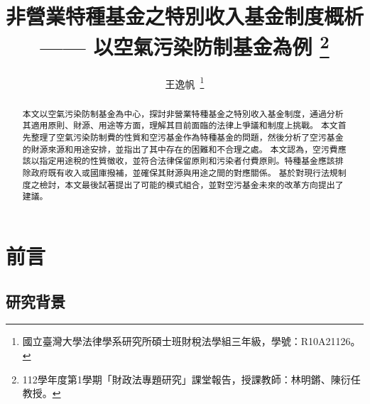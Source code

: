 \documentclass[12pt,a4paper]{article}
\author{王逸帆\,
\thanks{國立臺灣大學法律學系研究所碩士班財稅法學組三年級，學號：R10A21126。}
\vspace{-60em}
}
\date{}
\title{非營業特種基金之特別收入基金制度概析
\\  \large —— 以空氣污染防制基金為例
\thanks{
  112學年度第1學期「財政法專題研究」課堂報告，授課教師：林明鏘、陳衍任教授。}}
\begin{document}
\maketitle
\makeatother

\vspace{1pt}

\begin{abstract}
\setlength{\parindent}{2em}
\noindent
\hspace*{0.9\parindent}


本文以空氣污染防制基金為中心，探討非營業特種基金之特別收入基金制度，通過分析其適用原則、財源、用途等方面，理解其目前面臨的法律上爭議和制度上挑戰。
本文首先整理了空氣污染防制費的性質和空污基金作為特種基金的問題，然後分析了空污基金的財源來源和用途安排，並指出了其中存在的困難和不合理之處。 本文認為，空污費應該以指定用途稅的性質徵收，並符合法律保留原則和污染者付費原則。特種基金應該排除政府既有收入或國庫撥補，並確保其財源與用途之間的對應關係。 基於對現行法規制度之檢討，本文最後試著提出了可能的模式組合，並對空污基金未來的改革方向提出了建議。

   \end{abstract}



\thispagestyle{empty} %
\clearpage
    

\tableofcontents 


\thispagestyle{empty} %
\clearpage
\setcounter{page}{1} %

\section{前言}
\subsection{研究背景}
\end{document}
